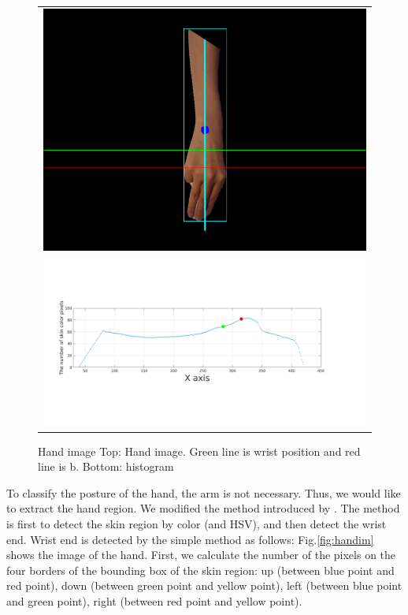 \begin{figure}
 \centering
 \begin{tabular}{c}
  \includegraphics[width=\hsize]{fig6/im.png} \\
  \includegraphics[width=\hsize]{fig6/hist.png}
 \end{tabular}
 \caption{Hand image Top: Hand image. Green line is wrist position and red line is b. Bottom: histogram}
 \label{fig:handim2}
\end{figure}

To classify the posture of the hand, the arm is not necessary. Thus, we would like to extract the hand region. We modified the method introduced by \cite{ra11}. The method is first to detect the skin region by color (and HSV), and then detect the wrist end. Wrist end is detected by the simple method as follows:
Fig.\ref{fig:handim} shows the image of the hand. 
First, we calculate the number of the pixels on the four borders of the bounding box of the skin region: 
up (between blue point and red point), 
down (between green point and yellow point), left (between blue point and green point), right (between red point and yellow point). 

